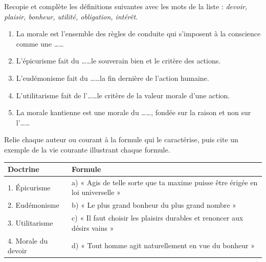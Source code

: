 \documentclass[11pt]{article}
\newcounter{popsec}
\newcounter{popsub}
\newcommand{\courssub}[1]{%
  \stepcounter{popsub}%
  \par\vspace{9pt}\noindent{\popxbold\fontsize{11.5}{13}\selectfont\color{popink}{\color{poporange}\thepopsec.\thepopsub}\hspace{6pt}#1}\par\nopagebreak\vspace{4pt}
}
\begin{document}
\begin{exercice}
Recopie et complète les définitions suivantes avec les mots de la liste : \emph{devoir, plaisir, bonheur, utilité, obligation, intérêt}.
\begin{enumerate}
\item La morale est l'ensemble des règles de conduite qui s'imposent à la conscience comme une \dots\dots
\item L'épicurisme fait du \dots\dots le souverain bien et le critère des actions.
\item L'eudémonisme fait du \dots\dots la fin dernière de l'action humaine.
\item L'utilitarisme fait de l'\dots\dots le critère de la valeur morale d'une action.
\item La morale kantienne est une morale du \dots\dots, fondée sur la raison et non sur l'\dots\dots
\end{enumerate}
\end{exercice}

\begin{exercice}
Relie chaque auteur ou courant à la formule qui le caractérise, puis cite un exemple de la vie courante illustrant chaque formule.
\begin{center}
\begin{tabularx}{\linewidth}{|l|X|}
\hline
\rowcolor{popblueL} \textbf{Doctrine} & \textbf{Formule} \\
\hline
1. Épicurisme & a) « Agis de telle sorte que ta maxime puisse être érigée en loi universelle » \\
\hline
2. Eudémonisme & b) « Le plus grand bonheur du plus grand nombre » \\
\hline
3. Utilitarisme & c) « Il faut choisir les plaisirs durables et renoncer aux désirs vains » \\
\hline
4. Morale du devoir & d) « Tout homme agit naturellement en vue du bonheur » \\
\hline
\end{tabularx}
\end{center}
\end{exercice}

\courssub{Je m'entraîne}
\end{document}
